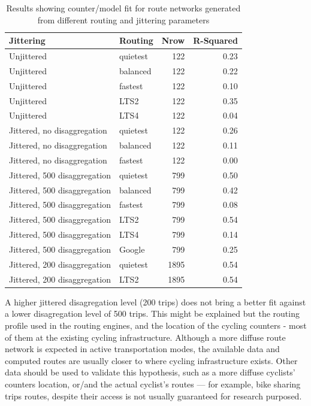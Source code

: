 \documentclass{isprs} %
\begin{document}
\begin{table}

\caption{\label{tab:unnamed-chunk-10}\label{tableresults}Results showing counter/model fit for route networks generated from different routing and jittering parameters}
\centering
\begin{tabular}[t]{llrr}
\toprule
Jittering & Routing & Nrow & R-Squared\\
\midrule
Unjittered & quietest & 122 & 0.23\\
Unjittered & balanced & 122 & 0.22\\
Unjittered & fastest & 122 & 0.10\\
Unjittered & LTS2 & 122 & 0.35\\
Unjittered & LTS4 & 122 & 0.04\\
\addlinespace
Jittered, no disaggregation & quietest & 122 & 0.26\\
Jittered, no disaggregation & balanced & 122 & 0.11\\
Jittered, no disaggregation & fastest & 122 & 0.00\\
\addlinespace
Jittered, 500 disaggregation & quietest & 799 & 0.50\\
Jittered, 500 disaggregation & balanced & 799 & 0.42\\
Jittered, 500 disaggregation & fastest & 799 & 0.08\\
Jittered, 500 disaggregation & LTS2 & 799 & 0.54\\
Jittered, 500 disaggregation & LTS4 & 799 & 0.14\\
Jittered, 500 disaggregation & Google & 799 & 0.25\\
\addlinespace
Jittered, 200 disaggregation & quietest & 1895 & 0.54\\
Jittered, 200 disaggregation & LTS2 & 1895 & 0.54\\
\bottomrule
\end{tabular}
\end{table}

A higher jittered disagregation level (200 trips) does not bring a better fit against a lower disagregation level of 500 trips. This might be explained but the routing profile used in the routing engines, and the location of the cycling counters - most of them at the existing cycling infrastructure.
Although a more diffuse route network is expected in active transportation modes, the available data and computed routes are usually closer to where cycling infrastructure exists. Other data should be used to validate this hypothesis, such as a more diffuse cyclists' counters location, or/and the actual cyclist's routes --- for example, bike sharing trips routes, despite their access is not usually guaranteed for research purposed.
\end{document}
